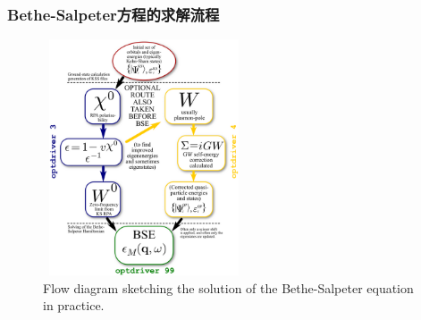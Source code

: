 \frame
{
	\frametitle{\textrm{Bethe-Salpeter}方程的求解流程}
\begin{figure}[h!]
\centering
\vspace{-10pt}
\includegraphics[height=2.75in,width=2.35in,viewport=0 0 600 735,clip]{Figures/BSE_solution.png}
\caption{\textrm{\tiny Flow diagram sketching the solution of the Bethe-Salpeter equation in practice.}}%
\label{GW-BSE_solution}
\end{figure}
}

